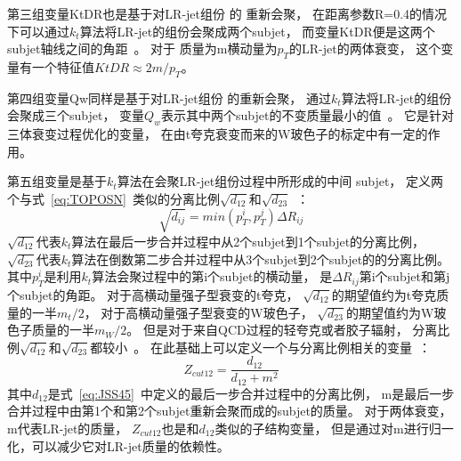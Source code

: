 第三组变量KtDR也是基于对LR-jet组份
的
重新会聚，
在距离参数R=0.4的情况下可以通过$k_t$算法将LR-jet的组份会聚成两个subjet，
而变量KtDR便是这两个subjet轴线之间的角距~\cite{JSS14}。
对于%
质量为m横动量为$p_T$的LR-jet的两体衰变，
这个变量有一个特征值$KtDR\approx 2m/p_T$。

第四组变量Qw同样是基于对LR-jet组份
的重新会聚，
通过$k_t$算法将LR-jet的组份会聚成三个subjet，
变量$Q_w$表示其中两个subjet的不变质量最小的值~\cite{JSS8}。
它是针对三体衰变过程优化的变量，
在由t夸克衰变而来的W玻色子的标定中有一定的作用。

第五组变量是基于$k_t$算法在会聚LR-jet组份过程中所形成的中间
subjet，
定义两个与式~\ref{eq:TOPOSN}~类似的分离比例$\sqrt{d_{12}}$和$\sqrt{d_{23}}$~\cite{JSS10}：
\begin{equation} 
\label{eq:JSS45}
\sqrt{d_{ij}}=min(p_T^i,p_T^j)\Delta R_{ij}
\end{equation}
$\sqrt{d_{12}}$代表$k_t$算法在最后一步合并过程中从2个subjet到1个subjet的分离比例，
$\sqrt{d_{23}}$代表$k_t$算法在倒数第二步合并过程中从3个subjet到2个subjet的的分离比例。
其中$p_T^i$是利用$k_t$算法会聚过程中的第i个subjet的横动量，
是$\Delta R_{ij}$第i个subjet和第j个subjet的角距。
对于高横动量强子型衰变的t夸克，
$\sqrt{d_{12}}$的期望值约为t夸克质量的一半$m_t/2$，
对于高横动量强子型衰变的W玻色子，
$\sqrt{d_{23}}$的期望值约为W玻色子质量的一半$m_W/2$。
但是对于来自QCD过程的轻夸克或者胶子辐射，
分离比例$\sqrt{d_{12}}$和$\sqrt{d_{23}}$都较小~\cite{JSD12}。
在此基础上可以定义一个与分离比例相关的变量~\cite{JSS8}：
\begin{equation} 
\label{eq:JSS46}
Z_{cut12}=\frac{d_{12}}{d_{12}+m^2}
\end{equation}
其中$d_{12}$是式~\ref{eq:JSS45}~中定义的最后一步合并过程中的分离比例，
m是最后一步合并过程中由第1个和第2个subjet重新会聚而成的subjet的质量。
对于两体衰变，m代表LR-jet的质量，
$Z_{cut12}$也是和$d_{12}$类似的子结构变量，
但是通过对m进行归一化，可以减少它对LR-jet质量的依赖性。



